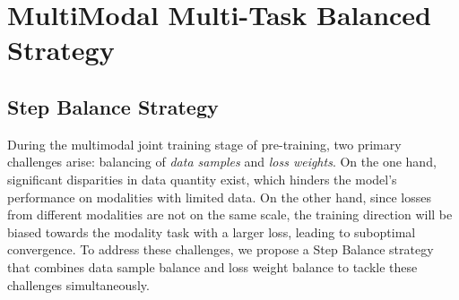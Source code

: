 \section{MultiModal Multi-Task Balanced Strategy}\label{sec:approach}



\subsection{Step Balance Strategy }\label{subsubsec-Step Balancing Strategy}
During the multimodal joint training stage of pre-training, two primary challenges arise: balancing of \textit{data samples} and \textit{loss weights}. On the one hand, significant disparities in data quantity exist, which hinders the model's performance on modalities with limited data. On the other hand, since losses from different modalities are not on the same scale, the training direction will be biased towards the modality task with a larger loss, leading to suboptimal convergence. To address these challenges, we propose a Step Balance strategy that combines data sample balance and loss weight balance to tackle these challenges simultaneously.


